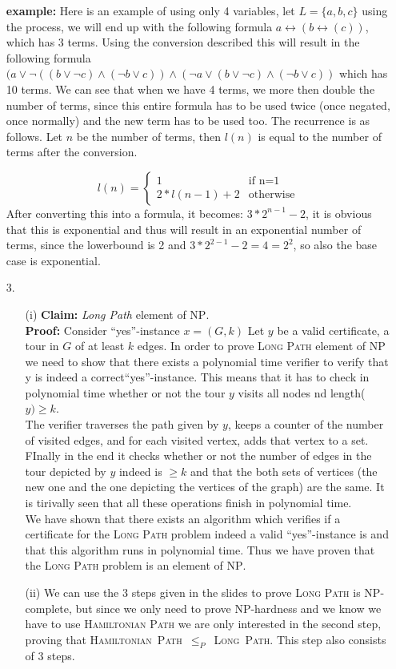\documentclass{article}
\begin{document}
\begin{itemize}
\textbf{example:} Here is an example of using only 4 variables, let $L=\{a,b,c\}$ using the process, we will end up with the following formula $a \leftrightarrow (b \leftrightarrow (c))$, which has 3 terms. Using the conversion described this will result in the following formula $(a \vee \neg ((b \vee \neg c) \wedge (\neg b \vee c)) \wedge (\neg a \vee (b \vee \neg c) \wedge (\neg b \vee c))$ which has 10 terms. We can see that when we have 4 terms, we more then double the number of terms, since this entire formula has to be used twice (once negated, once normally) and the new term has to be used too. The recurrence is as follows. Let $n$ be the number of terms, then $l(n)$ is equal to the number of terms after the conversion.

\[
l(n)=
\begin{cases}
1 & \text{if n=1}\\
2*l(n-1)+2 & \text{otherwise}
\end{cases}
\]
After converting this into a formula, it becomes: $3*2^{n-1}-2$, it is obvious that this is exponential and thus will result in an exponential number of terms, since the lowerbound is 2 and $3*2^{2-1}-2=4=2^2$, so also the base case is exponential.

\item[3.]
\begin{itemize}
\item[(i)] 
\textbf{Claim:} \emph{Long Path} element of \textsc{NP}.\\
\textbf{Proof:} Consider ``yes''-instance $x=(G,k)$ Let $y$ be a valid certificate, a tour in $G$ of at least $k$ edges. In order to prove \textsc{Long Path} element of \textsc{NP} we need to show that there exists a polynomial time verifier to verify that y is indeed a correct``yes''-instance. This means that it has to check in polynomial time whether or not the tour $y$ visits all nodes nd length($y)\ge k$. \\

The verifier traverses the path given by $y$, keeps a counter of the number of visited edges, and for each visited vertex, adds that vertex to a set. FInally in the end it checks whether or not the number of edges in the tour depicted by $y$ indeed is $\ge k$ and that the both sets of vertices (the new one and the one depicting the vertices of the graph) are the same. It is tirivally seen that all these operations finish in polynomial time.  \\

We have shown that there exists an algorithm which verifies if a certificate for the \textsc{Long Path} problem indeed a valid ``yes''-instance is and that this algorithm runs in polynomial time. Thus we have proven that the \textsc{Long Path} problem is an element of \textsc{NP}.
\item[(ii)] We can use the 3 steps given in the slides to prove \textsc{Long Path} is \textsc{NP}-complete, but since we only need to prove NP-hardness and we know we have to use \textsc{Hamiltonian Path} we are only interested in the second step, proving that \textsc{Hamiltonian~Path}~$\le_P$~\textsc{Long~Path}. This step also consists of 3 steps.


\end{itemize}
\end{itemize}
\end{document}
